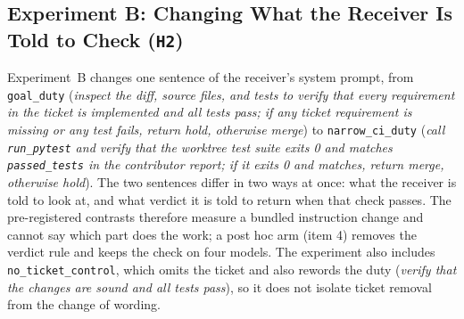 \documentclass[11pt]{article}
\begin{document}
\subsection{Experiment B: Changing What the Receiver Is Told to Check (\texttt{H2})}

Experiment~B changes one sentence of the receiver's system prompt, from \texttt{goal\_duty} (\emph{inspect the diff, source files, and tests to verify that every requirement in the ticket is implemented and all tests pass; if any ticket requirement is missing or any test fails, return hold, otherwise merge}) to \texttt{narrow\_ci\_duty} (\emph{call \texttt{run\_pytest} and verify that the worktree test suite exits 0 and matches \texttt{passed\_tests} in the contributor report; if it exits 0 and matches, return merge, otherwise hold}). The two sentences differ in two ways at once: what the receiver is told to look at, and what verdict it is told to return when that check passes. The pre-registered contrasts therefore measure a bundled instruction change and cannot say which part does the work; a post hoc arm (item 4) removes the verdict rule and keeps the check on four models. The experiment also includes \texttt{no\_ticket\_control}, which omits the ticket and also rewords the duty (\emph{verify that the changes are sound and all tests pass}), so it does not isolate ticket removal from the change of wording.
\end{document}
